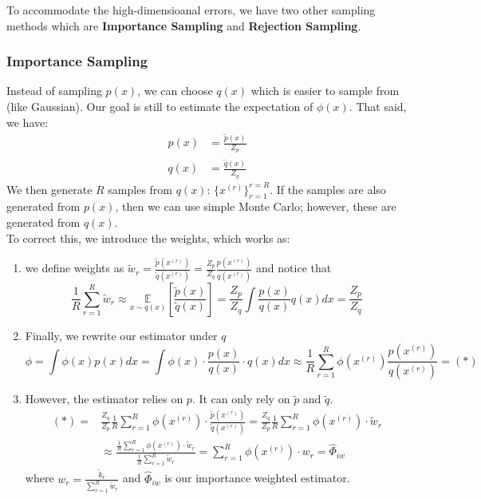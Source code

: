 To accommodate the high-dimensioanal errors, we have two other sampling methods which are \textbf{Importance Sampling} and \textbf{Rejection Sampling}.

\subsubsection*{Importance Sampling}
Instead of sampling $p(x)$, we can choose $q(x)$ which is easier to sample from (like Gaussian). Our goal is still to estimate the expectation of $\phi(x)$. That said, we have:
\begin{align*}
    p(x) &=\frac{\tilde{p}(x)}{Z_p}\\
    q(x) &=\frac{\tilde{q}(x)}{Z_q}
\end{align*} 
We then generate $R$ samples from $q(x)$: $\{x^{(r)}\}_{r=1}^{r=R}$. If the samples are also generated from $p(x)$, then we can use simple Monte Carlo; however, these are generated from $q(x)$.\\
To correct this, we introduce the weights, which works as:\\
\begin{enumerate}
    \item we define weights as $\tilde{w}_r=\frac{\tilde{p}\left(x^{(r)}\right)}{\tilde{q}\left(x^{(r)}\right)}=\frac{Z_p}{Z_q} \frac{p\left(x^{(r)}\right)}{q\left(x^{(r)}\right)}$ and notice that
    $$
    \frac{1}{R} \sum_{r=1}^R \tilde{w}_r \approx \underset{x \sim q(x)}{\mathbb{E}}\left[\frac{\tilde{p}(x)}{\tilde{q}(x)}\right]=\frac{Z_p}{Z_q} \int \frac{p(x)}{q(x)} q(x) d x=\frac{Z_p}{Z_q}
    $$
    \item Finally, we rewrite our estimator under $q$
    $$
    \phi=\int \phi(x) p(x) d x=\int \phi(x) \cdot \frac{p(x)}{q(x)} \cdot q(x) d x \approx \frac{1}{R} \sum_{r=1}^R \phi\left(x^{(r)}\right) \frac{p\left(x^{(r)}\right)}{q\left(x^{(r)}\right)}=(*)
    $$
    \item However, the estimator relies on $p$. It can only rely on $\tilde{p}$ and $\tilde{q}$.
    $$
    \begin{aligned}
    (*)= & \frac{Z_q}{Z_p} \frac{1}{R} \sum_{r=1}^R \phi\left(x^{(r)}\right) \cdot \frac{\tilde{p}\left(x^{(r)}\right)}{\tilde{q}\left(x^{(r)}\right)}=\frac{Z_q}{Z_p} \frac{1}{R} \sum_{r=1}^R \phi\left(x^{(r)}\right) \cdot \tilde{w}_r \\
    & \approx \frac{\frac{1}{R} \sum_{r=1}^R \phi\left(x^{(r)}\right) \cdot \tilde{w}_r}{\frac{1}{R} \sum_{r=1}^R \tilde{w}_r}=\sum_{r=1}^R \phi\left(x^{(r)}\right) \cdot w_r=\hat{\Phi}_{i w}
    \end{aligned}
    $$
    where $w_r=\frac{\tilde{k}_r}{\sum_{r=1}^R \tilde{w}_r}$ and $\hat{\Phi}_{i w}$ is our importance weighted estimator.
    \end{enumerate}

